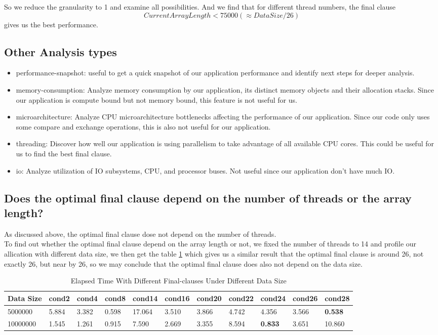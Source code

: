 \documentclass[article]{scrartcl}
\begin{document}
So we reduce the granularity to 1 and examine all possibilities. And we find that for different thread numbers, the final clause 
$$CurrentArrayLength < 75000(\approx DataSize / 26)$$
gives us the best performance.
\subsection{Other Analysis types}
\begin{itemize}
    \item performance-snapshot: useful to get a quick snapshot of our application performance and identify next
    steps for deeper analysis.
    \item memory-consumption: Analyze memory consumption by our application, its distinct memory
    objects and their allocation stacks. Since our application is compute bound but not memory bound, this feature is not useful for us.
    \item microarchitecture: Analyze CPU microarchitecture bottlenecks affecting the performance of
    our application. Since our code only uses some compare and exchange operations, this is also not useful for our application.
    \item threading: Discover how well our application is using parallelism to take advantage
    of all available CPU cores. This could be useful for us to find the best final clause.
    \item io: Analyze utilization of IO subsystems, CPU, and processor buses. Not useful since our application don't have much IO.
\end{itemize}

\subsection{Does the optimal final clause depend on the number of threads or the array length?}
As discussed above, the optimal final clause dose not depend on the number of threads.\\
To find out whether the optimal final clause depend on the array length or not, we fixed the number of threads to 14 and profile our allication with different data size, 
we then get the table \ref{tab::final_datasize} which gives us a similar result that the optimal final clause is around 26, not exactly 26, but near by 26, so we may conclude that 
the optimal final clause does also not depend on the data size.
\begin{table}[h!]
    \centering
  \begin{tabular}{ |p{2cm}|p{1cm}|p{1cm}|p{1cm}|p{1cm}|p{1cm}|p{1cm}|p{1cm}|p{1cm}|p{1cm}|p{1cm}|  }
    \hline
    Data Size & cond2 & cond4 & cond8 & cond14 & cond16 & cond20&cond22&cond24&cond26&cond28\\
     \hline
     5000000&5.884&3.382&0.598&17.064&3.510&3.866&4.742&4.356&3.566&\textbf{0.538}\\
     \hline
     10000000 & 1.545&1.261&0.915&7.590&2.669&3.355&8.594&\textbf{0.833}&3.651&10.860\\
    \hline
    \end{tabular}
    \caption{Elapsed Time With Different Final-clauses Under Different Data Size}
    \label{tab::final_datasize}
\end{table}
\end{document}
